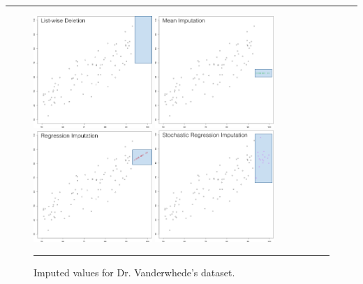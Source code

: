 \begin{center}
    \rule{0.5\textwidth}{.4pt}
\end{center}
\begin{figure}[t]
\centering
\includegraphics[width=0.4\textwidth]{images/DP/listwisedeletion.png}
\quad
\includegraphics[width=0.4\textwidth]{images/DP/mean.png} \\
\includegraphics[width=0.4\textwidth]{images/DP/regression.png} 
\quad
\includegraphics[width=0.4\textwidth]{images/DP/stochastic.png}
\caption[\small Imputed values for Dr. Vanderwhede's dataset]{\small Imputed values for Dr. Vanderwhede's dataset.}
\hrule\label{fig:theimputations}
\end{figure}
